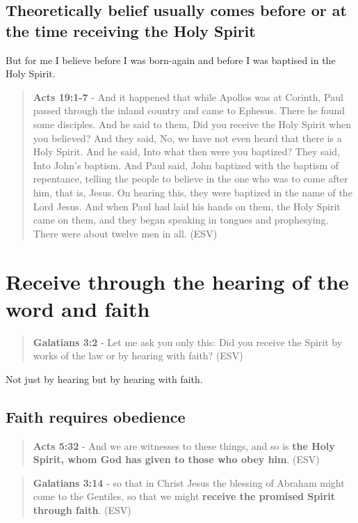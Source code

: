 \documentclass[11pt]{article}
\begin{document}
\subsection{Theoretically belief usually comes before or at the time receiving the Holy Spirit}
\label{sec:org1ed2770}
But for me I believe before I was born-again and before I was baptised in the Holy Spirit.

\begin{quote}
\textbf{Acts 19:1-7} - And it happened that while Apollos was at Corinth, Paul passed through the inland country and came to Ephesus. There he found some disciples. And he said to them, Did you receive the Holy Spirit when you believed? And they said, No, we have not even heard that there is a Holy Spirit. And he said, Into what then were you baptized? They said, Into John's baptism. And Paul said, John baptized with the baptism of repentance, telling the people to believe in the one who was to come after him, that is, Jesus. On hearing this, they were baptized in the name of the Lord Jesus. And when Paul had laid his hands on them, the Holy Spirit came on them, and they began speaking in tongues and prophesying. There were about twelve men in all. (ESV)
\end{quote}

\section{Receive through the hearing of the word and faith}
\label{sec:org33760ea}
\begin{quote}
\textbf{Galatians 3:2} - Let me ask you only this: Did you receive the Spirit by works of the law or by hearing with faith? (ESV)
\end{quote}

Not just by hearing but by hearing with faith.

\subsection{Faith requires obedience}
\label{sec:orgadc49b2}
\begin{quote}
\textbf{Acts 5:32} - And we are witnesses to these things, and so is \textbf{the Holy Spirit, whom God has given to those who obey him}. (ESV)
\end{quote}

\begin{quote}
\textbf{Galatians 3:14} - so that in Christ Jesus the blessing of Abraham might come to the Gentiles, so that we might \textbf{receive the promised Spirit through faith}. (ESV)
\end{quote}
\end{document}
